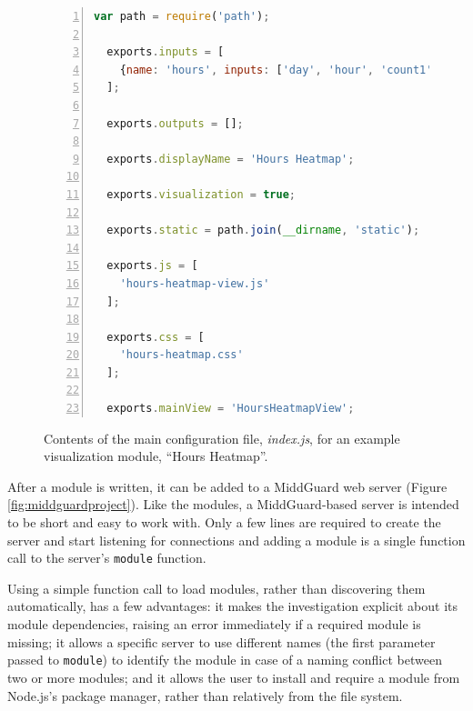 \documentclass[midd]{thesis}
\begin{document}
\begin{figure}[!ht]
  \centering
  \begin{lstlisting}[numbers=left,
                     numberstyle=\footnotesize,
                     numbersep=5pt,
                     language=javascript,
                     gobble=2]
  var path = require('path');

  exports.inputs = [
    {name: 'hours', inputs: ['day', 'hour', 'count1', 'count2']}
  ];

  exports.outputs = [];

  exports.displayName = 'Hours Heatmap';

  exports.visualization = true;

  exports.static = path.join(__dirname, 'static');

  exports.js = [
    'hours-heatmap-view.js'
  ];

  exports.css = [
    'hours-heatmap.css'
  ];

  exports.mainView = 'HoursHeatmapView';
  \end{lstlisting}
  \caption[The main configuration file for a visualization module.]{Contents of
  the main configuration file, \textit{index.js}, for an example visualization
  module, ``Hours Heatmap''.}
  \label{fig:visualizationmodule}
\end{figure}

After a module is written, it can be added to a MiddGuard web server (Figure
\ref{fig:middguardproject}). Like the modules, a MiddGuard-based server is
intended to be short and easy to work with. Only a few lines are required to
create the server and start listening for connections and adding a module is a
single function call to the server's \texttt{module} function.

Using a simple function call to load modules, rather than discovering them
automatically, has a few advantages: it makes the investigation explicit about
its module dependencies, raising an error immediately if a required module is
missing; it allows a specific server to use different names (the first parameter
passed to \texttt{module}) to identify the module in case of a naming conflict
between two or more modules; and it allows the user to install and require a
module from Node.js's package manager, rather than relatively from the file
system.
\end{document}

